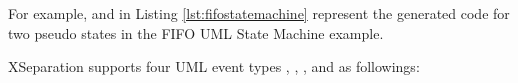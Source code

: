 \begin{comment}
\begin{itemize}[\footnotesize]
	\item \ti{pseudo state} $\rightarrow$ \tf{'pseudo\_keyword' name} 
	
	
	
	
	
	
	
	
	
\end{itemize}
\end{comment}

For example,  and  in Listing \ref{lst:fifostatemachine} represent the generated code for two  pseudo states in the FIFO UML State Machine example.  

\vskip 0.2cm
\noindent
{}
XSeparation supports four UML event types , , , and  as followings:

